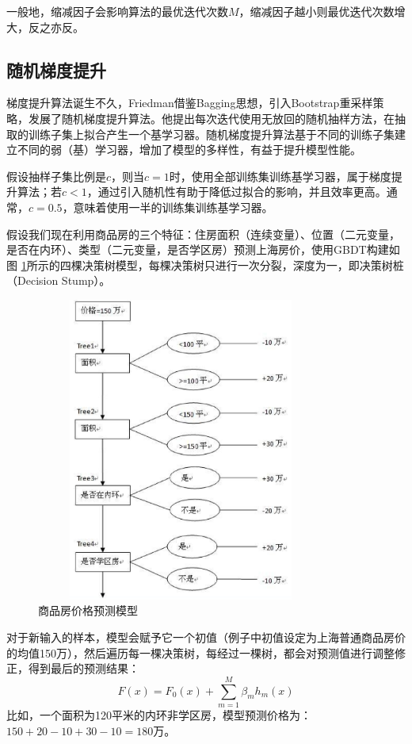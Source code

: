一般地，缩减因子会影响算法的最优迭代次数$M$，缩减因子越小则最优迭代次数增大，反之亦反。

\subsection{随机梯度提升}
梯度提升算法诞生不久，Friedman\cite{friedman2002stochastic}借鉴Bagging思想，引入Bootstrap重采样策略，发展了随机梯度提升算法。他提出每次迭代使用无放回的随机抽样方法，在抽取的训练子集上拟合产生一个基学习器。随机梯度提升算法基于不同的训练子集建立不同的弱（基）学习器，增加了模型的多样性，有益于提升模型性能。

假设抽样子集比例是$c$，则当$c=1$时，使用全部训练集训练基学习器，属于梯度提升算法；若$c<1$，通过引入随机性有助于降低过拟合的影响，并且效率更高。通常，$c=0.5$，意味着使用一半的训练集训练基学习器。

\begin{example}
假设我们现在利用商品房的三个特征：住房面积（连续变量）、位置（二元变量，是否在内环）、类型（二元变量，是否学区房）预测上海房价，使用GBDT构建如图
\ref{fig:treelink}所示的四棵决策树模型，每棵决策树只进行一次分裂，深度为一，即决策树桩（Decision Stump）。
\begin{figure}[htbp]
  \centering
  \includegraphics[width=0.85\textwidth,height=10cm]{figures/treelink.eps}
  \caption{商品房价格预测模型}\label{fig:treelink}
\end{figure}
对于新输入的样本，模型会赋予它一个初值（例子中初值设定为上海普通商品房价的均值150万），然后遍历每一棵决策树，每经过一棵树，都会对预测值进行调整修正，得到最后的预测结果：
\begin{equation}
    F(x) = F_0(x) + \sum\limits_{m=1}^M \beta_m h_m(x)
\end{equation}
比如，一个面积为120平米的内环非学区房，模型预测价格为：$150+20-10+30-10=180$万。
\end{example}

